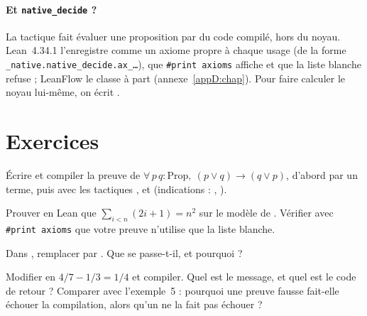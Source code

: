 \paragraph{Et \texttt{native\_decide} ?} La tactique  fait évaluer une proposition par du code
compilé, hors du noyau. Lean~4.34.1 l'enregistre comme un axiome propre à chaque usage (de la forme
\texttt{\_native.native\_decide.ax\_\dots}), que \texttt{\#print axioms} affiche et que la liste blanche refuse ; LeanFlow
le classe à part (annexe~\ref{appD:chap}). Pour faire calculer le noyau lui-même, on écrit .

\section{Exercices}\label{appC:sec:exos}

\begin{exercise}
Écrire et compiler la preuve de $\forall\,p\,q:\mathrm{Prop},\ (p\vee q)\to(q\vee p)$, d'abord par un terme, puis avec
les tactiques ,  et  (indications : , ).
\end{exercise}

\begin{exercise}
Prouver en Lean que $\sum_{i<n}(2i+1)=n^2$ sur le modèle de . Vérifier avec \texttt{\#print axioms}
que votre preuve n'utilise que la liste blanche.
\end{exercise}

\begin{exercise}
Dans , remplacer  par . Que se
passe-t-il, et pourquoi ?
\end{exercise}

\begin{exercise}
Modifier  en $4/7-1/3=1/4$ et compiler. Quel est le message, et quel est le code de retour ?
Comparer avec l'exemple~5 : pourquoi une preuve fausse fait-elle échouer la compilation, alors qu'un  ne la
fait pas échouer ?
\end{exercise}
